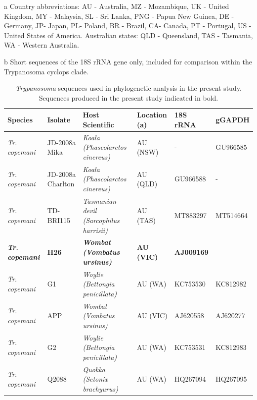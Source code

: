 \documentclass[a4paper, nobind]{templates/ociamthesis}
\begin{document}
\begin{landscape}\begingroup\fontsize{8}{10}\selectfont

\begin{ThreePartTable}
\begin{TableNotes}
\item[a] Country abbreviations: AU - Australia, MZ - Mozambique, UK - United Kingdom, MY - Malaysia, SL - Sri Lanka, PNG - Papua New Guinea, DE - Germany, JP- Japan, PL- Poland, BR - Brazil, CA- Canada, PT - Portugal, US - United States of America. Australian states: QLD - Queensland, TAS - Tasmania, WA - Western Australia.
\item[b] Short sequences of the 18S rRNA gene only, included for comparison within the Trypanosoma cyclops clade.
\end{TableNotes}
\begin{longtabu} to 
\caption[Sequences used for phylogenetic analysis of \textit{Trypanosoma} in Tasmanian devils.]{\label{tab:TA61}\textit{Trypanosoma} sequences used in phylogenetic analysis in the present study. Sequences produced in the present study indicated in bold.}\\
\toprule
Species & Isolate & Host Scientific & Location (a) & 18S rRNA & gGAPDH\\
\midrule
\em{Tr. copemani} & JD-2008a Mika & \em{Koala (Phascolarctos cinereus)} & AU (NSW) & - & GU966585\\
\em{Tr. copemani} & JD-2008a Charlton & \em{Koala (Phascolarctos cinereus)} & AU (QLD) & GU966588 & -\\
\em{Tr. copemani} & TD-BRI115 & \em{Tasmanian devil (Sarcophilus harrisii)} & AU (TAS) & MT883297 & MT514664\\
\textbf{\em{Tr. copemani}} & \textbf{H26} & \textbf{\em{Wombat (Vombatus ursinus)}} & \textbf{AU (VIC)} & \textbf{AJ009169} & \textbf{}\\
\em{Tr. copemani} & G1 & \em{Woylie (Bettongia penicillata)} & AU (WA) & KC753530 & KC812982\\
\em{Tr. copemani} & APP & \em{Wombat (Vombatus ursinus)} & AU (VIC) & AJ620558 & AJ620277\\
\em{Tr. copemani} & G2 & \em{Woylie (Bettongia penicillata)} & AU (WA) & KC753531 & KC812983\\
\em{Tr. copemani} & Q2088 & \em{Quokka (Setonix brachyurus)} & AU (WA) & HQ267094 & HQ267095\\

\end{longtabu}
\end{ThreePartTable}
\end{landscape}
\end{document}
